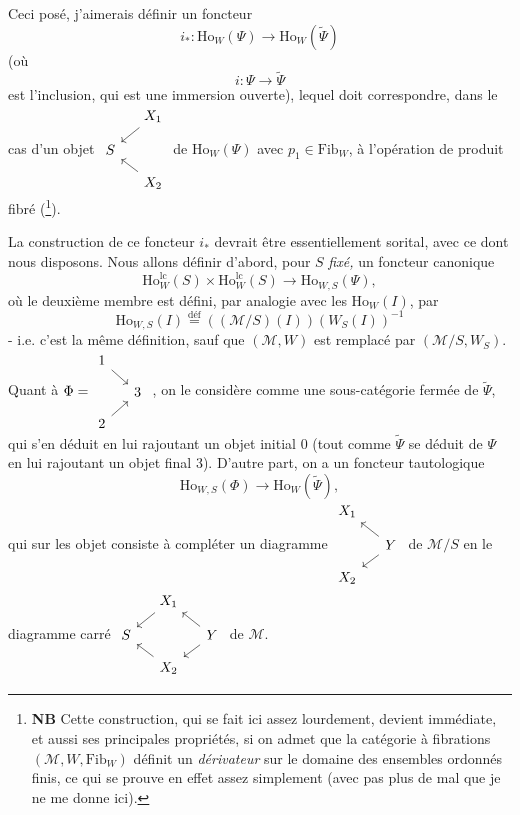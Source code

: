 \documentclass[11pt]{article}
\newcommand{\printedpage}[1]{\marginpar{\footnotesize p.~#1}}
\newcommand{\msp}[1]{\marginpar{\footnotesize [#1]}}
\newcommand{\Ho}{\mathrm{Ho}}
\newcommand{\lc}{\mathrm{lc}}
\begin{document}
Ceci posé, j'aimerais définir un foncteur
\[
i_* : \Ho_W(\Psi) \longrightarrow \Ho_W(\tilde{\Psi})
\]
(où
\[
i : \Psi \longrightarrow \tilde{\Psi}
\]
est l'inclusion, qui est une immersion ouverte), lequel doit correspondre, dans le cas d'un objet $\vcenter{\hbox{\begin{tikzcd}[row sep=small, column sep=small]
 & X_1 \arrow[dl] \\
S & \\
 & X_2 \arrow[ul]
\end{tikzcd}}}$ de $\Ho_W(\Psi)$ avec $p_1 \in \mathrm{Fib}_W$, à l'opération de produit fibré (\footnote[131]{\textbf{NB} Cette construction, qui se fait ici assez lourdement, devient immédiate, et aussi ses principales propriétés, si on admet que la catégorie à fibrations $(\mathcal{M}, W, \mathrm{Fib}_W)$ définit un \textit{dérivateur} sur le domaine des ensembles ordonnés finis, ce qui se prouve en effet assez simplement (avec pas plus de mal que je ne me donne ici).}).

\printedpage{158}

\msp{page 244}
La construction de ce foncteur $i_*$ devrait être essentiellement sorital, avec ce dont nous disposons. Nous allons définir d'abord, pour $S$ \textit{fixé,} un foncteur canonique
\[
\Ho^{\lc}_W(S) \times \Ho^{\lc}_W(S) \longrightarrow \Ho_{W,S}(\Psi), \tag*{$(*)$}
\]
où le deuxième membre est défini, par analogie avec les $\Ho_W(I)$, par
\[
\Ho_{W,S}(I) \overset{\text{déf}}{=} ((\mathcal{M}/S)(I))(W_S(I))^{-1}
\]
- i.e. c'est la même définition, sauf que $(\mathcal{M}, W)$ est remplacé par $(\mathcal{M}/S, W_S)$. Quant à $\Phi = \vcenter{\hbox{\begin{tikzcd}[row sep=small, column sep=small]
1 \arrow[dr] & \\
 & 3 \\
2 \arrow[ur] &
\end{tikzcd}}}$ , on le considère comme une sous-catégorie fermée de $\tilde{\Psi}$, qui s'en déduit en lui rajoutant un objet initial 0 (tout comme $\tilde{\Psi}$ se déduit de $\Psi$ en lui rajoutant un objet final 3). D'autre part, on a un foncteur tautologique
\[
\Ho_{W,S}(\Phi) \longrightarrow \Ho_W(\tilde{\Psi}), \tag*{$(*')$}
\]
qui sur les objet consiste à compléter un diagramme $\vcenter{\hbox{\begin{tikzcd}[row sep=small, column sep=small] %
X_1 & \\
 & Y \arrow[ul] \arrow[dl] \\
X_2 &
\end{tikzcd}}}$ de $\mathcal{M}/S$ en le diagramme carré $\vcenter{\hbox{\begin{tikzcd}[row sep=small, column sep=small]
 & X_1 \arrow[dl] & \\
S & & Y \arrow[ul] \arrow[dl] \\
 & X_2 \arrow[ul] &
\end{tikzcd}}}$ de $\mathcal{M}$.
\end{document}
